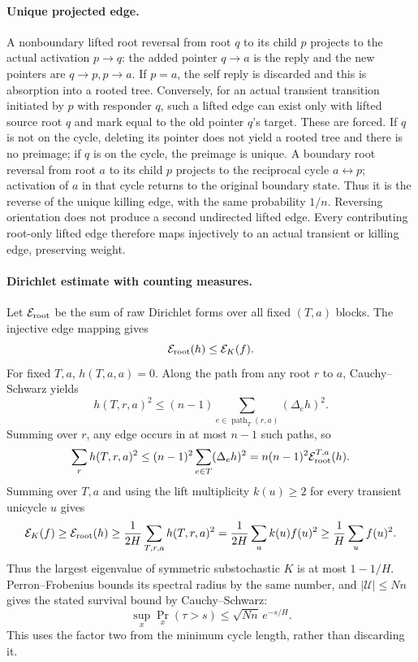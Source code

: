 \documentclass[11pt]{article}
\begin{document}
\paragraph{Unique projected edge.}
A nonboundary lifted root reversal from root $q$ to its child $p$
projects to the actual activation $p\to q$: the added pointer
$q\to a$ is the reply and the new pointers are $q\to p,p\to a$.
If $p=a$, the self reply is discarded and this is absorption into
a rooted tree. Conversely, for an actual transient transition
initiated by $p$ with responder $q$, such a lifted edge can exist
only with lifted source root $q$ and mark equal to the old pointer
$q$'s target. These are forced. If $q$ is not on the cycle, deleting
its pointer does not yield a rooted tree and there is no preimage;
if $q$ is on the cycle, the preimage is unique.
A boundary root reversal from root $a$ to its child $p$ projects
to the reciprocal cycle $a\leftrightarrow p$; activation of $a$
in that cycle returns to the original boundary state. Thus it is
the reverse of the unique killing edge, with the same probability
$1/n$. Reversing orientation does not produce a second undirected
lifted edge. Every contributing root-only lifted edge therefore maps
injectively to an actual transient or killing edge, preserving weight.

\paragraph{Dirichlet estimate with counting measures.}
Let $\mathcal E_{\rm root}$ be the sum of raw Dirichlet forms over
all fixed $(T,a)$ blocks. The injective edge mapping gives
\[
 \mathcal E_{\rm root}(h)\le\mathcal E_K(f).
\]
For fixed $T,a$, $h(T,a,a)=0$. Along the path from any root $r$
to $a$, Cauchy--Schwarz yields
\[
 h(T,r,a)^2\le(n-1)\sum_{e\in\operatorname{path}_T(r,a)}(\Delta_eh)^2.
\]
Summing over $r$, any edge occurs in at most $n-1$ such paths, so
\[
 \sum_r h(T,r,a)^2
 \le(n-1)^2\sum_{e\in T}(\Delta_eh)^2
 =n(n-1)^2\mathcal E_{\rm root}^{T,a}(h).
\]
Summing over $T,a$ and using the lift multiplicity $k(u)\ge2$
for every transient unicycle $u$ gives
\[
 \mathcal E_K(f)\ge\mathcal E_{\rm root}(h)
 \ge\frac1{2H}\sum_{T,r,a}h(T,r,a)^2
 =\frac1{2H}\sum_u k(u)f(u)^2
 \ge\frac1H\sum_u f(u)^2.
\]
Thus the largest eigenvalue of symmetric substochastic $K$ is at
most $1-1/H$. Perron--Frobenius bounds its spectral radius by the
same number, and $|\mathcal U|\le Nn$ gives the stated survival
bound by Cauchy--Schwarz:
\[
 \sup_x\Pr_x(\tau>s)\le\sqrt{Nn}\,e^{-s/H}.
\]
This uses the factor two from the minimum cycle length, rather than discarding it.
\end{document}
